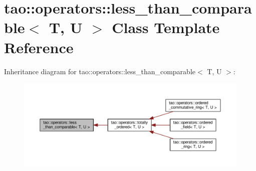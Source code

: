 \hypertarget{classtao_1_1operators_1_1less__than__comparable}{}\section{tao\+:\+:operators\+:\+:less\+\_\+than\+\_\+comparable$<$ T, U $>$ Class Template Reference}
\label{classtao_1_1operators_1_1less__than__comparable}


Inheritance diagram for tao\+:\+:operators\+:\+:less\+\_\+than\+\_\+comparable$<$ T, U $>$\+:\nopagebreak
\begin{figure}[H]
\begin{center}
\leavevmode
\includegraphics[width=350pt]{classtao_1_1operators_1_1less__than__comparable__inherit__graph}
\end{center}
\end{figure}

